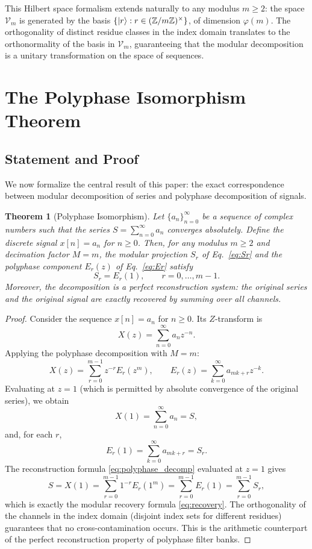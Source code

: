 \documentclass[12pt,a4paper]{article}
\theoremstyle{plain}
\newtheorem{theorem}{Theorem}[section]
\theoremstyle{definition}
\theoremstyle{remark}
\begin{document}
This Hilbert space formalism extends naturally to any modulus $m \ge 2$: the space $\mathcal{V}_m$ is generated by the basis $\{\ket{r} : r \in (\mathbb{Z}/m\mathbb{Z})^{\times}\}$, of dimension $\varphi(m)$. The orthogonality of distinct residue classes in the index domain translates to the orthonormality of the basis in $\mathcal{V}_m$, guaranteeing that the modular decomposition is a unitary transformation on the space of sequences.

\section{The Polyphase Isomorphism Theorem}
\label{sec:isomorphism}

\subsection{Statement and Proof}
We now formalize the central result of this paper: the exact correspondence between modular decomposition of series and polyphase decomposition of signals.

\begin{theorem}[Polyphase Isomorphism]
\label{thm:isomorphism}
Let \(\{a_n\}_{n=0}^{\infty}\) be a sequence of complex numbers such that the series \(S = \sum_{n=0}^{\infty} a_n\) converges absolutely. Define the discrete signal \(x[n] = a_n\) for \(n \ge 0\). Then, for any modulus \(m \ge 2\) and decimation factor \(M = m\), the modular projection \(S_r\) of Eq.~\eqref{eq:Sr} and the polyphase component \(E_r(z)\) of Eq.~\eqref{eq:Er} satisfy
\begin{equation}
S_r = E_r(1), \qquad r = 0, \dots, m-1.
\label{eq:equality}
\end{equation}
Moreover, the decomposition is a perfect reconstruction system: the original series and the original signal are exactly recovered by summing over all channels.
\end{theorem}

\begin{proof}
Consider the sequence \(x[n] = a_n\) for \(n \ge 0\). Its \(Z\)-transform is
\[
X(z) = \sum_{n=0}^{\infty} a_n z^{-n}.
\]
Applying the polyphase decomposition with \(M = m\):
\[
X(z) = \sum_{r=0}^{m-1} z^{-r} E_r(z^m), \qquad E_r(z) = \sum_{k=0}^{\infty} a_{mk+r} z^{-k}.
\]
Evaluating at \(z = 1\) (which is permitted by absolute convergence of the original series), we obtain
\[
X(1) = \sum_{n=0}^{\infty} a_n = S,
\]
and, for each \(r\),
\[
E_r(1) = \sum_{k=0}^{\infty} a_{mk+r} = S_r.
\]
The reconstruction formula \eqref{eq:polyphase_decomp} evaluated at \(z=1\) gives
\[
S = X(1) = \sum_{r=0}^{m-1} 1^{-r} E_r(1^m) = \sum_{r=0}^{m-1} E_r(1) = \sum_{r=0}^{m-1} S_r,
\]
which is exactly the modular recovery formula \eqref{eq:recovery}. The orthogonality of the channels in the index domain (disjoint index sets for different residues) guarantees that no cross-contamination occurs. This is the arithmetic counterpart of the perfect reconstruction property of polyphase filter banks.
\end{proof}
\end{document}
